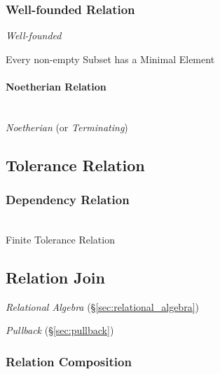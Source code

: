 \subsubsection{Well-founded Relation}\label{sec:well_founded}

\emph{Well-founded}

Every non-empty Subset has a Minimal Element



\paragraph{Noetherian Relation}\label{sec:noetherian_relation}
\hfill \\

\emph{Noetherian} (or \emph{Terminating})



\subsection{Tolerance Relation}\label{sec:tolerance_relation}

\subsubsection{Dependency Relation}\label{sec:dependency_relation}
\hfill \\

Finite Tolerance Relation



\subsection{Relation Join}\label{sec:relation_join}

\emph{Relational Algebra} (\S\ref{sec:relational_algebra})

\emph{Pullback} (\S\ref{sec:pullback})



\subsubsection{Relation Composition}\label{sec:relation_composition}

